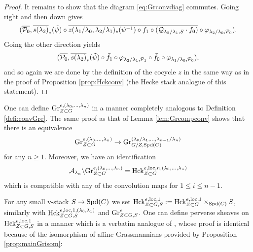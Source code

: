 \begin{proof}
   It remains to show that the diagram \eqref{eq:Grconvdiag} commutes. Going right and then down gives
   \begin{equation*}
       (\overline{\mathcal{P}_{0}}, \overline{s(\lambda_{2})}_{*}(\tilde{\psi}) \circ \overline{z(\lambda_{1}/\lambda_{0},\lambda_{2}/\lambda_{1})_{*}(\psi^{-1}) \circ f_{1} \circ (\mathcal{Q}_{\lambda_{2}/\lambda_{1},S} \cdot f_{0})} \circ \varphi_{\lambda_{2}/\lambda_{0},\mathcal{P}_{0}}).
   \end{equation*}
   Going the other direction yields
   \begin{equation*}
        (\overline{\mathcal{P}_{0}},  \overline{s(\lambda_{2})}_{*}(\tilde{\psi}) \circ \bar{f}_{1} \circ \varphi_{\lambda_{2}/\lambda_{1},\mathcal{P}_{1}} \circ \bar{f}_{0} \circ \varphi_{\lambda_{1}/\lambda_{0},\mathcal{P}_{0}}),
   \end{equation*}
    and so again we are done by the definition of the cocycle $z$ in the same way as in the proof of Proposition \ref{prop:Hckconv} (the Hecke stack analogue of this statement).        
    \end{proof}


    \begin{rque}
        One can define $\textnormal{Gr}_{Z \subset G}^{e,(\lambda_{0}, \dots, \lambda_{n})}$ in a manner completely analogous to Definition \ref{defi:convGre}. The same proof as that of Lemma \ref{lem:Grcompconv} shows that there is an equivalence 
        \begin{equation*}
        \textnormal{Gr}_{Z \subset G}^{e,(\lambda_{0}, \dots, \lambda_{n})} \to \textnormal{Gr}_{G/Z,\mathrm{Spd}(C)}^{(\lambda_{0}/\lambda_{1}, \dots, \lambda_{n-1}/\lambda_{n})}
       \end{equation*}
        for any $n \geq 1$. Moreover, we have an identification 
        \begin{equation*}
      \mathcal{A}_{\lambda_{n}} \backslash \textnormal{Gr}_{Z \subset G}^{e,(\lambda_{0}, \dots, \lambda_{n})}  = \mathrm{Hck}_{Z \subset G}^{e,\mathrm{loc},n,(\lambda_{0}, \dots, \lambda_{n})} 
        \end{equation*}
        which is compatible with any of the convolution maps for $1 \leq i \leq n-1$.
    \end{rque}
   

 For any small v-stack $S \to \mathrm{Spd}(C)$ we set $\mathrm{Hck}_{Z \subset G,S}^{e,\mathrm{loc},1} := \mathrm{Hck}_{Z \subset G}^{e,\mathrm{loc},1} \times_{\mathrm{Spd}(C)} S$, similarly with $\mathrm{Hck}_{Z \subset G,S}^{e,\mathrm{loc},1,(\lambda_{0},\lambda_{1})}$ and $\textnormal{Gr}_{Z \subset G,S}^{e}$. One can define perverse sheaves on $\mathrm{Hck}_{Z \subset G,S}^{e,\mathrm{loc},1}$ in a manner which is a verbatim analogue of \cite[Definition/Proposition VI.7.1]{Geometrization}, whose proof is identical because of the isomorphism of affine Grassmannians provided by Proposition \ref{prop:mainGrisom}:

